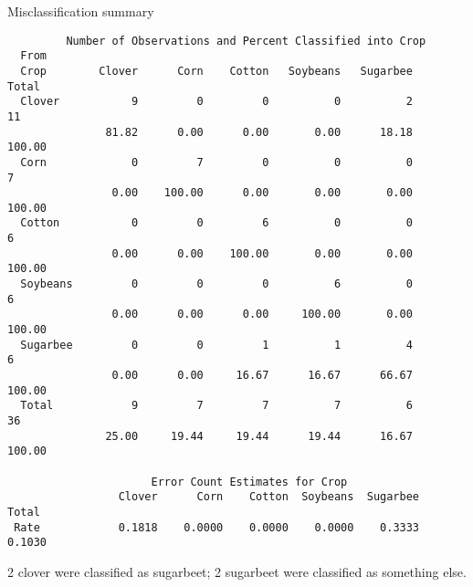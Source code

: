 \documentclass[pdf]{prosper}
\begin{document}
\begin{slide}{Misclassification summary}

{\scriptsize
\begin{verbatim}
         Number of Observations and Percent Classified into Crop
  From
  Crop        Clover      Corn    Cotton   Soybeans   Sugarbee     Total
  Clover           9         0         0          0          2        11
               81.82      0.00      0.00       0.00      18.18    100.00
  Corn             0         7         0          0          0         7
                0.00    100.00      0.00       0.00       0.00    100.00
  Cotton           0         0         6          0          0         6
                0.00      0.00    100.00       0.00       0.00    100.00
  Soybeans         0         0         0          6          0         6
                0.00      0.00      0.00     100.00       0.00    100.00
  Sugarbee         0         0         1          1          4         6
                0.00      0.00     16.67      16.67      66.67    100.00
  Total            9         7         7          7          6        36
               25.00     19.44     19.44      19.44      16.67    100.00

                      Error Count Estimates for Crop
                 Clover      Corn    Cotton  Soybeans  Sugarbee     Total
 Rate            0.1818    0.0000    0.0000    0.0000    0.3333    0.1030
\end{verbatim}
}

2 clover were classified as sugarbeet; 2 sugarbeet were classified as something else.
  
\end{slide}
\end{document}
